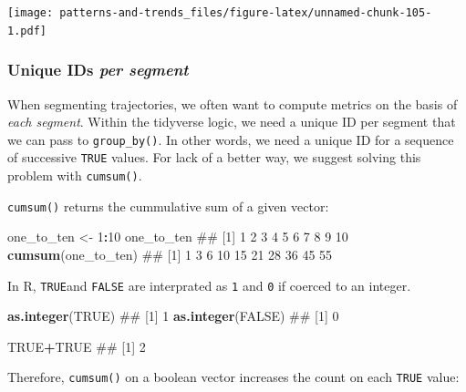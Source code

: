 \documentclass[]{book}
\newenvironment{Shaded}{\begin{snugshade}}{\end{snugshade}}
\newcommand{\KeywordTok}[1]{\textcolor[rgb]{0.13,0.29,0.53}{\textbf{#1}}}
\newcommand{\DecValTok}[1]{\textcolor[rgb]{0.00,0.00,0.81}{#1}}
\newcommand{\StringTok}[1]{\textcolor[rgb]{0.31,0.60,0.02}{#1}}
\newcommand{\OtherTok}[1]{\textcolor[rgb]{0.56,0.35,0.01}{#1}}
\newcommand{\OperatorTok}[1]{\textcolor[rgb]{0.81,0.36,0.00}{\textbf{#1}}}
\newcommand{\NormalTok}[1]{#1}
\begin{document}
\texttt{[image: patterns-and-trends\_files/figure-latex/unnamed-chunk-105-1.pdf]}

\subsubsection{\texorpdfstring{Unique IDs \emph{per
segment}}{Unique IDs per segment}}\label{unique-ids-per-segment}

When segmenting trajectories, we often want to compute metrics on the
basis of \emph{each segment}. Within the tidyverse logic, we need a
unique ID per segment that we can pass to \texttt{group\_by()}. In other
words, we need a unique ID for a sequence of successive \texttt{TRUE}
values. For lack of a better way, we suggest solving this problem with
\texttt{cumsum()}.

\texttt{cumsum()} returns the cummulative sum of a given vector:

\begin{Shaded}
\begin{Highlighting}[]
\NormalTok{one_to_ten <-}\StringTok{ }\DecValTok{1}\OperatorTok{:}\DecValTok{10}
\NormalTok{one_to_ten}
\NormalTok{##  [1]  1  2  3  4  5  6  7  8  9 10}
\KeywordTok{cumsum}\NormalTok{(one_to_ten)}
\NormalTok{##  [1]  1  3  6 10 15 21 28 36 45 55}
\end{Highlighting}
\end{Shaded}

In R, \texttt{TRUE}and \texttt{FALSE} are interprated as \texttt{1} and
\texttt{0} if coerced to an integer.

\begin{Shaded}
\begin{Highlighting}[]
\KeywordTok{as.integer}\NormalTok{(}\OtherTok{TRUE}\NormalTok{)}
\NormalTok{## [1] 1}
\KeywordTok{as.integer}\NormalTok{(}\OtherTok{FALSE}\NormalTok{)}
\NormalTok{## [1] 0}

\OtherTok{TRUE}\OperatorTok{+}\OtherTok{TRUE}
\NormalTok{## [1] 2}
\end{Highlighting}
\end{Shaded}

Therefore, \texttt{cumsum()} on a boolean vector increases the count on
each \texttt{TRUE} value:
\end{document}
